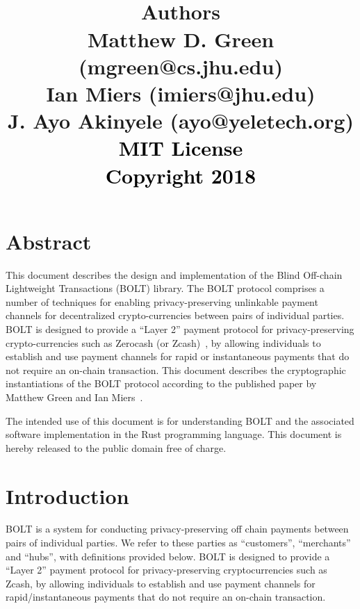 \documentclass[11pt]{report}
\title{%
\vspace{-1in}
\center
\vspace{1in}
\center
\textcolor{black}{
  {\selectfont{\huge{Blind Off-Chain\\Lightweight Transactions\\(BOLT)}}}}
  \center
  \textcolor{black}{
  {\selectfont{\huge{Version \myversion}}}}
\vspace{1in}
\\
{{\bf Authors}\\ Matthew D. Green (mgreen@cs.jhu.edu) \\ Ian Miers (imiers@jhu.edu)\\J. Ayo Akinyele (ayo@yeletech.org)}
\\
\vspace{2in}
  \textcolor{black}{
  {{\small{MIT License\\Copyright {\textcopyright} 2018}}}}
}
\date{}
\begin{document}
\maketitle
\tableofcontents
\thispagestyle{myfancypage}

\newpage
\chapter*{Abstract}
\label{ch:abstract}
\thispagestyle{myfancypage}

This document describes the design and implementation of the Blind Off-chain Lightweight Transactions (BOLT) library. The BOLT protocol comprises a number of techniques for enabling privacy-preserving unlinkable payment channels for decentralized crypto-currencies between pairs of individual parties. BOLT is designed to provide a ``Layer 2'' payment protocol for privacy-preserving crypto-currencies such as Zerocash (or Zcash)~\cite{Zerocash}, by allowing individuals to establish and use payment channels for rapid or instantaneous payments that do not require an on-chain transaction. This document describes the cryptographic instantiations of the BOLT protocol according to the published paper by Matthew Green and Ian Miers~\cite{BoltCCS}.

The intended use of this document is for understanding BOLT and the associated software implementation in the Rust programming language.  
This document is hereby released to the public domain free of charge.

\thispagestyle{myfancypage}
\chapter{Introduction}
\label{sec:introduction}
\thispagestyle{myfancypage}

BOLT is a system for conducting privacy-preserving off chain payments between pairs of individual parties. We refer to these parties as ``customers'', ``merchants'' and ``hubs'', with definitions provided below. BOLT is designed to provide a ``Layer 2'' payment protocol for privacy-preserving cryptocurrencies such as Zcash, by allowing individuals to establish and use payment channels for rapid/instantaneous payments that do not require an on-chain transaction.
\end{document}
